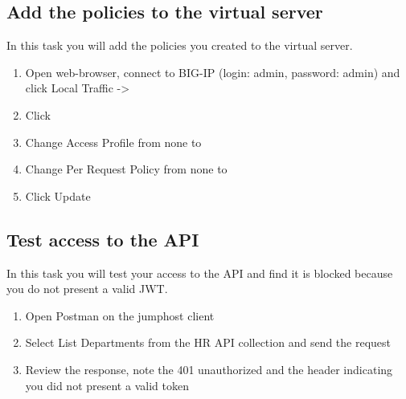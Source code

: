\documentclass[letterpaper,10pt,english]{sphinxmanual}
\begin{document}
\subsection{Add the policies to the virtual server}
\label{\detokenize{class1/module2/module2:add-the-policies-to-the-virtual-server}}
In this task you will add the policies you created to the virtual
server.
\begin{enumerate}
\item {} 
Open web-browser, connect to BIG-IP  (login: admin, password: admin) and click Local Traffic -\textgreater{} 

\item {} 
Click 

\item {} 
Change Access Profile from none to 

\item {} 
Change Per Request Policy from none to 

\end{enumerate}
\begin{quote}

\noindent{}
\end{quote}
\begin{enumerate}
\setcounter{enumi}{4}
\item {} 
Click Update

\end{enumerate}


\subsection{Test access to the API}
\label{\detokenize{class1/module2/module2:test-access-to-the-api}}
In this task you will test your access to the API and find it is blocked
because you do not present a valid JWT.
\begin{enumerate}
\item {} 
Open Postman on the jumphost client

\item {} 
Select List Departments from the HR API collection and send the
request

\item {} 
Review the response, note the 401 unauthorized and the header
indicating you did not present a valid token

\end{enumerate}
\begin{quote}

\noindent{}
\end{quote}
\end{document}

